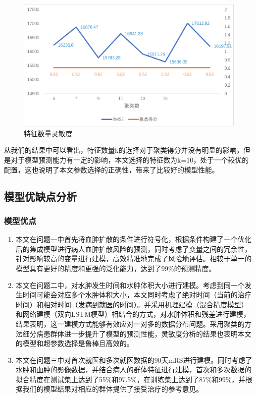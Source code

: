 \documentclass[bwprint]{gmcmthesis}
\begin{document}
\begin{figure}[ht]
    \centering
    \includegraphics[width = 0.8\linewidth]{figures/7.12.png}
    \caption{特征数量灵敏度}
    \label{fig:feature}
\end{figure}
从我们的结果中可以看出，特征数量k的选择对于聚类得分并没有明显的影响，但是对于模型预测能力有一定的影响，本文选择的特征数为k=10，处于一个较优的配置，这也说明了本文参数选择的正确性，带来了比较好的模型性能。
\subsection{模型优缺点分析}
\subsubsection{模型优点}
\begin{enumerate}
    \item 本文在问题一中首先将血肿扩散的条件进行符号化，根据条件构建了一个优化后的集成模型进行病人血肿扩散风险的预测，同时考虑了变量之间的冗余性，针对影响较高的变量进行建模，高效精准地完成了风险地评估。相较于单一的模型具有更好的精度和更强的泛化能力，达到了99\%的预测精度。
    \item 本文在问题二中，对水肿发生时间和水肿体积大小进行建模。考虑到同一个发生时间可能会对应多个水肿体积大小，本文同时考虑了绝对时间（当前的治疗时间）和相对时间（发病到就医的时间）。并采用机理建模（混合精度模型）和网络建模（双向LSTM模型）相结合的方式，对水肿体积和残差进行建模，结果表明，这一建模方式能够有效应对一对多的数据分布问题。采用聚类的方法细分病患群体进一步提升了模型的预测性能，灵敏度分析的结果也表明本文的模型和超参数选择是鲁棒且高效的。
    \item 本文在问题三中对首次就医和多次就医数据的90天mRS进行建模。同时考虑了水肿和血肿的影像数据，并结合病人的群体特征进行建模，首次和多次数据的拟合精度在测试集上达到了55\%和97.5\%，在训练集上达到了87\%和99\%，并根据我们的模型结果对相应的群体提供了接受治疗的参考意见。
\end{enumerate}
\end{document}
